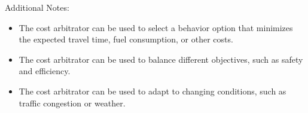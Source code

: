 Additional Notes:

\begin{itemize}
    \item The cost arbitrator can be used to select a behavior option that minimizes the expected travel time, fuel consumption, or other costs.
    \item The cost arbitrator can be used to balance different objectives, such as safety and efficiency.
    \item The cost arbitrator can be used to adapt to changing conditions, such as traffic congestion or weather.
\end{itemize}

